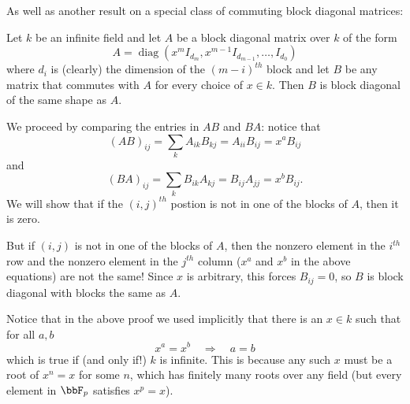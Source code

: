 \documentclass[12pt]{article}
\begin{document}
As well as another result on a special class of commuting block diagonal matrices:
\begin{lem}\label{lem:block-diag}
	Let $k$ be an infinite field and let $A$ be a block diagonal matrix over $k$ of the form
	\[A=\operatorname{diag}(x^mI_{d_m},x^{m-1}I_{d_{m-1}},\dots,I_{d_0})\]
	where $d_i$ is (clearly) the dimension of the $(m-i)^{th}$ block and let $B$ be any matrix that commutes with $A$
	for every choice of $x\in k$. Then $B$ is block diagonal of the same shape as $A$. 
\end{lem}
\begin{prf}
	We proceed by comparing the entries in $AB$ and $BA$: notice that 
	\[(AB)_{ij}=\sum_k A_{ik}B_{kj}=A_{ii}B_{ij}=x^aB_{ij}\]
	and 
	\[(BA)_{ij}=\sum_k B_{ik}A_{kj}=B_{ij}A_{jj}=x^bB_{ij}.\]
	We will show that if the $(i,j)^{th}$ postion is not in one of the blocks of $A$, then it is zero.

	But if $(i,j)$ is not in one of the blocks of $A$, then the nonzero element in the $i^{th}$ row and the nonzero element in 
	the $j^{th}$ column ($x^a$ and $x^b$ in the above equations) are not the same! Since $x$ is arbitrary, this forces $B_{ij}=0$,
	so $B$ is block diagonal with blocks the same as $A$.
\end{prf}
\begin{rmk}
	Notice that in the above proof we used implicitly that there is an $x\in k$ such that for all $a,b$
	\[x^a=x^b\quad\Rightarrow\quad a=b\]
	which is true if (and only if!) $k$ is infinite. This is because any such $x$ must be a root of $x^n=x$ for some $n$, which 
	has finitely many roots over any field (but every element in $\bbF_p$ satisfies $x^p=x$).
\end{rmk}
\end{document}
